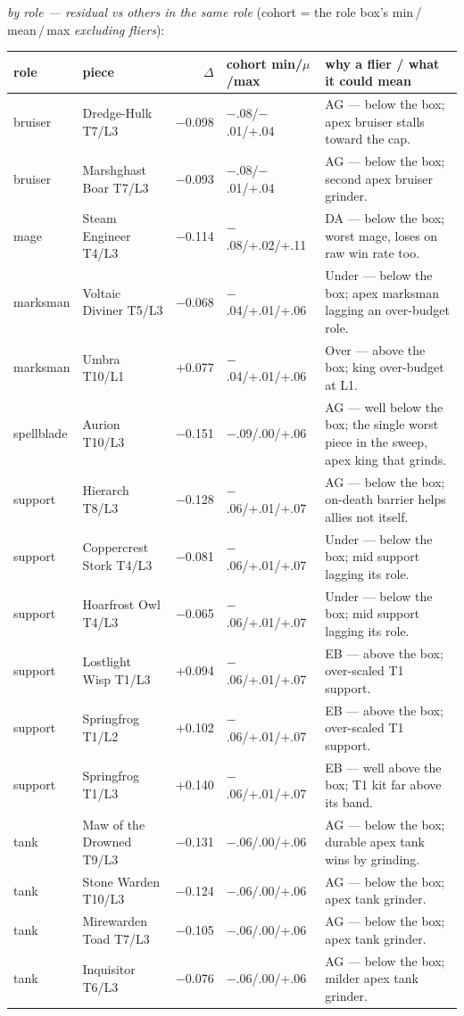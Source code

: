 \documentclass[10pt]{article}
\begin{document}
\textit{by role --- residual vs others in the same role} (cohort = the role box's min\,/\,mean\,/\,max \emph{excluding fliers}):\\
{\small
\begin{tabularx}{\linewidth}{llrlL}
\toprule
\textbf{role} & \textbf{piece} & \textbf{$\Delta$} & \textbf{cohort min/$\mu$/max} & \textbf{why a flier / what it could mean} \\
\midrule
bruiser & Dredge-Hulk T7/L3 & $-$0.098 & $-$.08/$-$.01/+.04 & AG --- below the box; apex bruiser stalls toward the cap. \\
bruiser & Marshghast Boar T7/L3 & $-$0.093 & $-$.08/$-$.01/+.04 & AG --- below the box; second apex bruiser grinder. \\
mage & Steam Engineer T4/L3 & $-$0.114 & $-$.08/+.02/+.11 & DA --- below the box; worst mage, loses on raw win rate too. \\
marksman & Voltaic Diviner T5/L3 & $-$0.068 & $-$.04/+.01/+.06 & Under --- below the box; apex marksman lagging an over-budget role. \\
marksman & Umbra T10/L1 & +0.077 & $-$.04/+.01/+.06 & Over --- above the box; king over-budget at L1. \\
spellblade & Aurion T10/L3 & $-$0.151 & $-$.09/.00/+.06 & AG --- well below the box; the single worst piece in the sweep, apex king that grinds. \\
support & Hierarch T8/L3 & $-$0.128 & $-$.06/+.01/+.07 & AG --- below the box; on-death barrier helps allies not itself. \\
support & Coppercrest Stork T4/L3 & $-$0.081 & $-$.06/+.01/+.07 & Under --- below the box; mid support lagging its role. \\
support & Hoarfrost Owl T4/L3 & $-$0.065 & $-$.06/+.01/+.07 & Under --- below the box; mid support lagging its role. \\
support & Lostlight Wisp T1/L3 & +0.094 & $-$.06/+.01/+.07 & EB --- above the box; over-scaled T1 support. \\
support & Springfrog T1/L2 & +0.102 & $-$.06/+.01/+.07 & EB --- above the box; over-scaled T1 support. \\
support & Springfrog T1/L3 & +0.140 & $-$.06/+.01/+.07 & EB --- well above the box; T1 kit far above its band. \\
tank & Maw of the Drowned T9/L3 & $-$0.131 & $-$.06/.00/+.06 & AG --- below the box; durable apex tank wins by grinding. \\
tank & Stone Warden T10/L3 & $-$0.124 & $-$.06/.00/+.06 & AG --- below the box; apex tank grinder. \\
tank & Mirewarden Toad T7/L3 & $-$0.105 & $-$.06/.00/+.06 & AG --- below the box; apex tank grinder. \\
tank & Inquisitor T6/L3 & $-$0.076 & $-$.06/.00/+.06 & AG --- below the box; milder apex tank grinder. \\
\bottomrule
\end{tabularx}
}
\medskip
\end{document}
